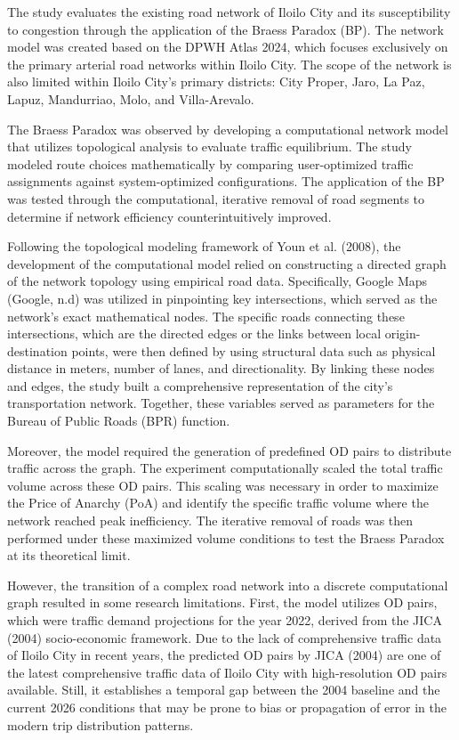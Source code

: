 The study evaluates the existing road network of Iloilo City and its susceptibility to congestion through the application of the Braess Paradox (BP). The network model was created based on the DPWH Atlas 2024, which focuses exclusively on the primary arterial road networks within Iloilo City. The scope of the network is also limited within Iloilo City's primary districts: City Proper, Jaro, La Paz, Lapuz, Mandurriao, Molo, and Villa-Arevalo.

The Braess Paradox was observed by developing a computational network model that utilizes topological analysis to evaluate traffic equilibrium. The study modeled route choices mathematically by comparing user-optimized traffic assignments against system-optimized configurations. The application of the BP was tested through the computational, iterative removal of road segments to determine if network efficiency counterintuitively improved.

Following the topological modeling framework of Youn et al. (2008), the development of the computational model relied on constructing a directed graph of the network topology using empirical road data. Specifically, Google Maps (Google, n.d) was utilized in pinpointing key intersections, which served as the network's exact mathematical nodes. The specific roads connecting these intersections, which are the directed edges or the links between local origin-destination points, were then defined by using structural data such as physical distance in meters, number of lanes, and directionality. By linking these nodes and edges, the study built a comprehensive representation of the city's transportation network. Together, these variables served as parameters for the Bureau of Public Roads (BPR) function.

Moreover, the model required the generation of predefined OD pairs to distribute traffic across the graph. The experiment computationally scaled the total traffic volume across these OD pairs. This scaling was necessary in order to maximize the Price of Anarchy (PoA) and identify the specific traffic volume where the network reached peak inefficiency. The iterative removal of roads was then performed under these maximized volume conditions to test the Braess Paradox at its theoretical limit.

 However, the transition of a complex road network into a discrete computational graph resulted in some research limitations. First, the model utilizes OD pairs, which were traffic demand projections for the year 2022, derived from the JICA (2004) socio-economic framework. Due to the lack of comprehensive traffic data of Iloilo City in recent years, the predicted OD pairs by JICA (2004) are one of the latest comprehensive traffic data of Iloilo City with high-resolution OD pairs available. Still, it establishes a temporal gap between the 2004 baseline and the current 2026 conditions that may be prone to bias or propagation of error in the modern trip distribution patterns.

